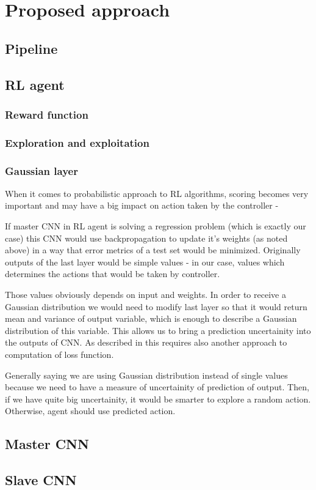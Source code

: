 \chapter{Proposed approach}

\section{Pipeline}
\section{RL agent}
\subsection{Reward function}
\subsection{Exploration and exploitation}
\subsection{Gaussian layer}
When it comes to probabilistic approach to RL algorithms, scoring becomes very important and may have a big impact on action taken by the controller - \cite[see][]{tilmann}

If master CNN in RL agent is solving a regression problem (which is exactly our case) this CNN would use backpropagation to update it's weights (as noted above) in a way that error metrics of a test set would be minimized. Originally outputs of the last layer would be simple values - in our case, values which determines the actions that would be taken by controller.

Those values obviously depends on input and weights. In order to receive a Gaussian distribution we would need to modify last layer so that it would return mean and variance of output variable, which is enough to describe a Gaussian distribution of this variable. This allows us to bring a prediction uncertainity into the outputs of CNN. As described in \cite{2017arXiv170404110S} this requires also another approach to computation of loss function.

Generally saying we are using Gaussian distribution instead of single values because we need to have a measure of uncertainity of prediction of output. Then, if we have quite big uncertainity, it would be smarter to explore a random action. Otherwise, agent should use predicted action.







\section{Master CNN}
\section{Slave CNN}
